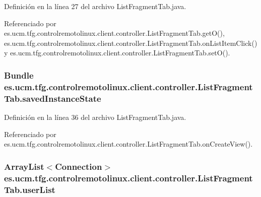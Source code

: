 Definición en la línea 27 del archivo List\-Fragment\-Tab.\-java.



Referenciado por es.\-ucm.\-tfg.\-controlremotolinux.\-client.\-controller.\-List\-Fragment\-Tab.\-get\-O(), es.\-ucm.\-tfg.\-controlremotolinux.\-client.\-controller.\-List\-Fragment\-Tab.\-on\-List\-Item\-Click() y es.\-ucm.\-tfg.\-controlremotolinux.\-client.\-controller.\-List\-Fragment\-Tab.\-set\-O().

\hypertarget{classes_1_1ucm_1_1tfg_1_1controlremotolinux_1_1client_1_1controller_1_1ListFragmentTab_a236516cfdd7813ca1c9e279b1b08a0ab}{
\subsubsection[{saved\-Instance\-State}]{\setlength{\rightskip}{0pt plus 5cm}Bundle es.\-ucm.\-tfg.\-controlremotolinux.\-client.\-controller.\-List\-Fragment\-Tab.\-saved\-Instance\-State\hspace{0.3cm}{\ttfamily [private]}}}\label{classes_1_1ucm_1_1tfg_1_1controlremotolinux_1_1client_1_1controller_1_1ListFragmentTab_a236516cfdd7813ca1c9e279b1b08a0ab}


Definición en la línea 36 del archivo List\-Fragment\-Tab.\-java.



Referenciado por es.\-ucm.\-tfg.\-controlremotolinux.\-client.\-controller.\-List\-Fragment\-Tab.\-on\-Create\-View().

\hypertarget{classes_1_1ucm_1_1tfg_1_1controlremotolinux_1_1client_1_1controller_1_1ListFragmentTab_a75469695cff3b7dfc7ce5acd2b20f5d2}{
\subsubsection[{user\-List}]{\setlength{\rightskip}{0pt plus 5cm}Array\-List$<${\bf Connection}$>$ es.\-ucm.\-tfg.\-controlremotolinux.\-client.\-controller.\-List\-Fragment\-Tab.\-user\-List\hspace{0.3cm}{\ttfamily [private]}}}\label{classes_1_1ucm_1_1tfg_1_1controlremotolinux_1_1client_1_1controller_1_1ListFragmentTab_a75469695cff3b7dfc7ce5acd2b20f5d2}


